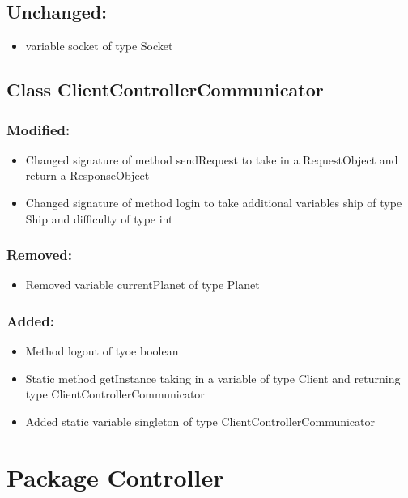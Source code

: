 \documentclass{article}
\begin{document}
\subsection{Unchanged:}
\begin{itemize}
\item variable socket of type Socket
\end{itemize}


\subsection{Class ClientControllerCommunicator}

\subsubsection{Modified:}
\begin{itemize}
\item Changed signature of method sendRequest to take in a RequestObject and return a ResponseObject
\item Changed signature of method login to take additional variables ship of type Ship and difficulty of type int
\end{itemize}

\subsubsection{Removed:}
\begin{itemize}
\item Removed variable currentPlanet of type Planet
\end{itemize}

\subsubsection{Added:}
\begin{itemize}
\item Method logout of tyoe boolean
\item Static method getInstance taking in a variable of type Client and returning type ClientControllerCommunicator
\item Added static variable singleton of type ClientControllerCommunicator 
\end{itemize}


\section{Package Controller}
\end{document}
